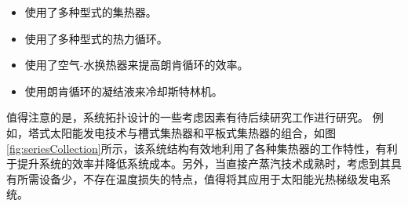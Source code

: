 \begin{itemize}
  \item 使用了多种型式的集热器。
  \item 使用了多种型式的热力循环。
  \item 使用了空气-水换热器来提高朗肯循环的效率。
  \item 使用朗肯循环的凝结液来冷却斯特林机。
\end{itemize}

值得注意的是，系统拓扑设计的一些考虑因素有待后续研究工作进行研究。 例如，塔式太阳能发电技术与槽式集热器和平板式集热器的组合，如图\ref{fig:seriesCollection}所示，该系统结构有效地利用了各种集热器的工作特性，有利于提升系统的效率并降低系统成本。另外，当直接产蒸汽技术成熟时，考虑到其具有所需设备少，不存在温度损失的特点，值得将其应用于太阳能光热梯级发电系统。